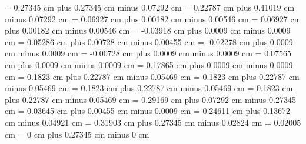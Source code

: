 \gre@interwordspacetextnotes = 0.27345 cm plus 0.27345 cm minus 0.07292 cm
\gre@interwordspacetext = 0.22787 cm plus 0.41019 cm minus 0.07292 cm
\gre@bitrivirspace = 0.06927 cm plus 0.00182 cm minus 0.00546 cm
\gre@bitristrospace = 0.06927 cm plus 0.00182 cm minus 0.00546 cm
\gre@punctuminclinatumshift= -0.03918 cm plus 0.0009 cm minus 0.0009 cm
\gre@beforepunctainclinatashift= 0.05286 cm plus 0.00728 cm minus 0.00455 cm
\gre@punctuminclinatumanddebilisshift= -0.02278 cm plus 0.0009 cm minus 0.0009 cm
\gre@punctuminclinatumdebilisshift= -0.00728 cm plus 0.0009 cm minus 0.0009 cm
\gre@punctuminclinatumbigshift= 0.07565 cm plus 0.0009 cm minus 0.0009 cm
\gre@punctuminclinatummaxshift= 0.17865 cm plus 0.0009 cm minus 0.0009 cm
\gre@spacearoundsmallbar = 0.1823 cm plus 0.22787 cm minus 0.05469 cm
\gre@spacearoundminor = 0.1823 cm plus 0.22787 cm minus 0.05469 cm
\gre@spacearoundmaior = 0.1823 cm plus 0.22787 cm minus 0.05469 cm
\gre@spacearoundfinalis = 0.1823 cm plus 0.22787 cm minus 0.05469 cm
\gre@spacebeforefinalfinalis= 0.29169 cm plus 0.07292 cm minus 0.27345 cm
\gre@spacearoundclefbars= 0.03645 cm plus 0.00455 cm minus 0.0009 cm
\gre@textbartextspace = 0.24611 cm plus 0.13672 cm minus 0.04921 cm
\gre@notebarspace = 0.31903 cm plus 0.27345 cm minus 0.02824 cm
\gre@maximumspacewithoutdash = 0.02005 cm
\gre@afterclefnospace = 0 cm plus 0.27345 cm minus 0 cm
